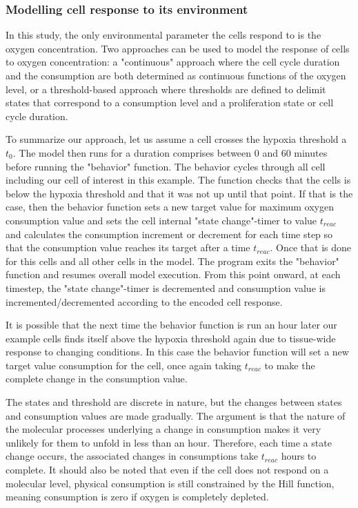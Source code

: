 \documentclass[11pt,a4paper]{article}
\begin{document}
\subsubsection{Modelling cell response to its environment}
In this study, the only environmental parameter the cells respond to is the oxygen concentration. Two approaches can be used to model the response of cells to oxygen concentration: a "continuous" approach where the cell cycle duration and the consumption are both determined as continuous functions of the oxygen level, or a threshold-based approach where thresholds are defined to delimit states that correspond to a consumption level and a proliferation state or cell cycle duration. 

To summarize our approach, let us assume a cell crosses the hypoxia threshold a $t_0$. The model then runs for a duration comprises between 0 and 60 minutes before running the "behavior" function. The behavior cycles through all cell including our cell of interest in this example. The function checks that the cells is below the hypoxia threshold and that it was not up until that point. If that is the case, then the behavior function sets a new target value for maximum oxygen consumption value and sets the cell internal "state change"-timer to value  $t_{reac}$ and calculates the consumption increment or decrement for each time step so that the consumption value reaches its target after a time $t_{reac}$.  Once that is done for this cells and all other cells in the model. The program exits the "behavior" function and resumes overall model execution. From this point onward, at each timestep, the "state change"-timer is decremented and consumption value is incremented/decremented according to the encoded cell response.

It is possible that the next time the behavior function is run an hour later our example cells finds itself above the hypoxia threshold again due to tissue-wide response to changing conditions. In this case the behavior function will set a new target value consumption for the cell, once again taking $t_{reac}$ to make the complete change in the consumption value. 

The states and threshold are discrete in nature, but the changes between states and consumption values are made gradually. The argument is that the nature of the molecular processes underlying a change in consumption makes it very unlikely for them to unfold in less than an hour. Therefore, each time a state change occurs, the associated changes in consumptions take $t_{reac}$ hours to complete. It should also be noted that even if the cell does not respond on a molecular level, physical consumption is still constrained by the Hill function, meaning consumption is zero if oxygen is completely depleted.
\end{document}

